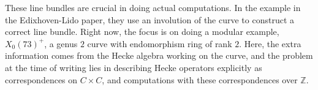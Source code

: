 \documentclass[12pt]{article}
\newcommand{\Z}{\mathbb{Z}}
\theoremstyle{plain}
\theoremstyle{definition}
\theoremstyle{remark}
\begin{document}
These line bundles are crucial in doing actual computations. In the example in the Edixhoven-Lido paper, they use an involution of the curve to construct a correct line bundle. Right now, the focus is on doing a modular example, $X_0(73)^+$, a genus $2$ curve with endomorphism ring of rank $2$. Here, the extra information comes from the Hecke algebra working on the curve, and the problem at the time of writing lies in describing Hecke operators explicitly as correspondences on $C \times C$, and computations with these correspondences over $\Z$. 


\newpage


\end{document}
